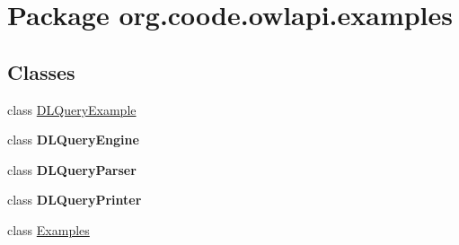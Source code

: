 \hypertarget{namespaceorg_1_1coode_1_1owlapi_1_1examples}{\section{Package org.\-coode.\-owlapi.\-examples}
\label{namespaceorg_1_1coode_1_1owlapi_1_1examples}
}
\subsection*{Classes}
\begin{DoxyCompactItemize}
\item 
class \hyperlink{classorg_1_1coode_1_1owlapi_1_1examples_1_1_d_l_query_example}{D\-L\-Query\-Example}
\item 
class {\bfseries D\-L\-Query\-Engine}
\item 
class {\bfseries D\-L\-Query\-Parser}
\item 
class {\bfseries D\-L\-Query\-Printer}
\item 
class \hyperlink{classorg_1_1coode_1_1owlapi_1_1examples_1_1_examples}{Examples}
\end{DoxyCompactItemize}
